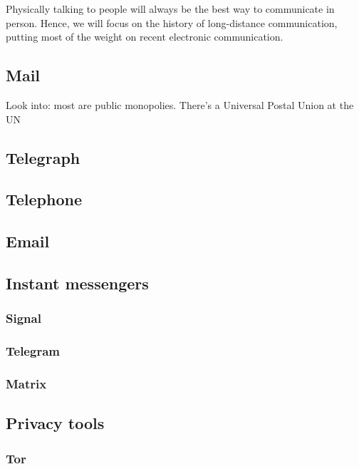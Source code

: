 \documentclass[sigconf, nonacm, balance=false, natbib=false]{acmart}
\begin{document}
Physically talking to people will always be the best way to communicate in person. Hence, we will focus on the history of long-distance communication, putting most of the weight on recent electronic communication.

\subsection{Mail}

Look into:
most are public monopolies.
There's a Universal Postal Union at the UN

\subsection{Telegraph}

\subsection{Telephone}

\subsection{Email}

\subsection{Instant messengers}

\subsubsection{Signal}

\subsubsection{Telegram}

\subsubsection{Matrix}

\subsection{Privacy tools}

\subsubsection{Tor}
\end{document}
